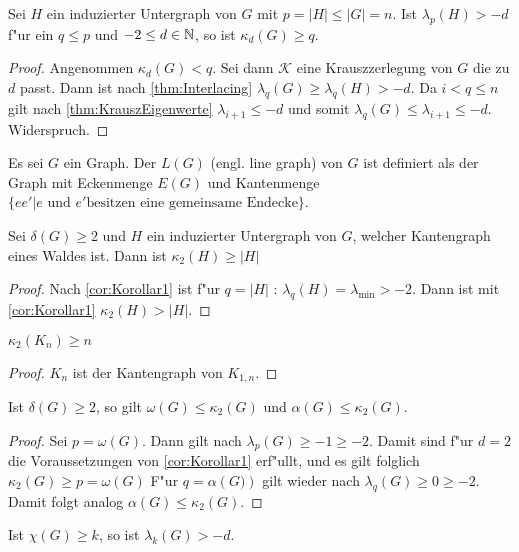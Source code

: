 \begin{corollary}
  \label{cor:Korollar1}
  Sei $H$ ein induzierter Untergraph von $G$ mit $p = \left| H\right| \leq \left|G\right| = n$.
  Ist $\lambda_p (H) > -d $ f"ur ein $q \leq p$ und $-2 \leq d \in {\mathbb{N}}$, so ist $\kappa_d(G) \geq q$.
\end{corollary}
\begin{proof}
  Angenommen $\kappa_d(G) < q$. Sei dann $\mathcal{K}$ eine Krauszzerlegung von $G$ die zu $d$ passt. Dann ist nach \ref{thm:Interlacing} $\lambda_{q}(G)\geq \lambda_{q}(H) > -d$. 
  Da $i < q \leq n$ gilt nach \ref{thm:KrauszEigenwerte} $\lambda_{i+1}\leq -d$ und somit $\lambda_{q}(G)\leq \lambda_{i+1} \leq -d$. Widerspruch.
\end{proof}
Es sei $G$ ein Graph. Der  $L(G)$ (engl. line graph) von $G$ ist definiert als der Graph mit Eckenmenge $E(G)$ und Kantenmenge $\{ee'|e\text{ und } e' \text{besitzen eine gemeinsame Endecke}\}$.

\begin{corollary}
  Sei $\delta(G) \geq 2$ und $H$ ein induzierter Untergraph von $G$, welcher Kantengraph eines Waldes ist. 
  Dann ist $\kappa_{2}(H)\geq \left|H\right|$
\end{corollary}

\begin{proof}
  Nach \ref{cor:Korollar1} ist f"ur $q=\left|H\right|$ : $\lambda_q(H)=\lambda_{\text{min}}> -2$. Dann ist mit \ref{cor:Korollar1} $\kappa_{2}\left( H \right) > \left| H\right|$.
\end{proof}

\begin{corollary}[Klotz]
  $\kappa_{2}\left( K_n \right) \geq n$
\end{corollary}

\begin{proof}
  $K_n$ ist der Kantengraph von $K_{1,n}$.
\end{proof}
\begin{corollary}
  Ist $\delta\left( G \right) \geq 2$, so gilt $\omega\left( G \right)\leq \kappa_{2}\left( G \right)$ und $\alpha\left( G \right)\leq \kappa_{2}\left( G \right)$.
\end{corollary}

\begin{proof}
  Sei $p = \omega(G)$. Dann gilt nach $\lambda_{p}\left( G \right)\geq -1\geq -2$. Damit sind f"ur $d=2$ die Voraussetzungen von \ref{cor:Korollar1} erf"ullt, und es gilt folglich $\kappa_{2}\left( G \right)\geq p = \omega\left( G \right)$ 
  F"ur $q=\alpha\left( G) \right)$ gilt wieder nach $\lambda_{q}\left( G \right)\geq 0 \geq -2$. Damit folgt analog $\alpha\left( G \right) \leq \kappa_{2}\left( G \right)$.
\end{proof}
\begin{conjecture}
  \label{con:MainConjecture}
  Ist $\chi\left( G \right) \geq k$, so ist $\lambda_k\left( G \right) > -d$.
\end{conjecture}

